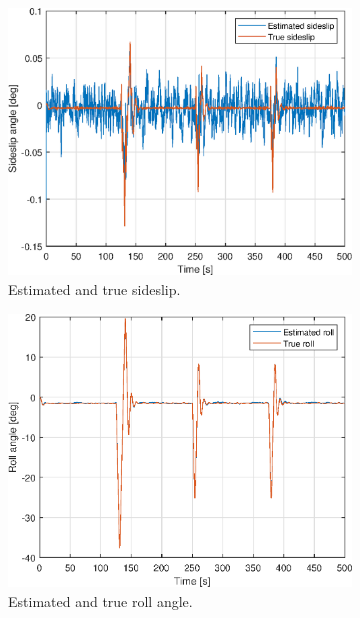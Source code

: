 \begin{figure}[ht]
\begin{subfigure}[b]{0.45\textwidth}
		\includegraphics[width=\textwidth]{figures/3f/beta_sideslip.eps}
		\caption{Estimated and true sideslip. }
		\label{fig:3f_beta_sideslip}
	\end{subfigure}
	\begin{subfigure}[b]{0.45\textwidth}
		\includegraphics[width=\textwidth]{figures/3f/roll_phi.eps}
		\caption{Estimated and true roll angle. }
		\label{fig:3f_roll_angle}
    \end{subfigure}	
    \begin{subfigure}[b]{0.45\textwidth}

\end{subfigure}
\end{figure}
